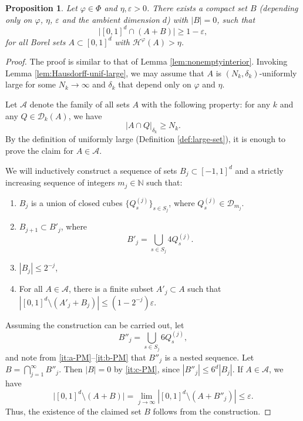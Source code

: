 \documentclass[12pt]{amsart}
\newcommand{\e}{\varepsilon}
\renewcommand{\phi}{\varphi}
\newtheorem{proposition}[theorem]{Proposition}
\def\N{{\mathbb{N}}}
\newcommand{\cD}{\mathcal{D}}
\numberwithin{theorem}{section}
\numberwithin{equation}{section}
\begin{document}
\begin{proposition}
    Let $\phi\in\Phi$ and $\eta,\e>0$. There exists a compact set $B$ (depending only on $\phi$, $\eta$, $\e$ and the ambient dimension $d$) with $|B|=0$, such that
    \[
        \bigl|[0,1]^d\cap (A+B)\bigr| \ge 1-\e,
    \]
    for all Borel sets $A\subset [0,1]^d$ with $\mathcal{H}^{\phi}(A)>\eta$.
\end{proposition}
\begin{proof}
    The proof is similar to that of Lemma \ref{lem:nonemptyinterior}. Invoking Lemma \ref{lem:Hausdorff-unif-large}, we may assume that $A$ is $(N_k,\delta_k)$-uniformly large for some $N_k\to\infty$ and $\delta_k$ that depend only on $\phi$ and $\eta$.

    Let $\mathcal{A}$ denote the family of all sets $A$ with the following property: for any $k$ and any $Q\in\mathcal{D}_k(A)$, we have
    \begin{equation} \label{eq:good-assumption}
        |A\cap Q|_{\delta_k} \ge N_k.
    \end{equation}
    By the definition of uniformly large (Definition \ref{def:large-set}), it is enough to prove the claim for $A\in\mathcal{A}$.

    We will inductively construct a sequence of sets $B_j\subset [-1,1]^d$ and a strictly increasing sequence of integers $m_j\in\N$ such that:
    \begin{enumerate}[label=(\alph*)]
        \item \label{it:a-PM} $B_j$ is a union of closed cubes $\{Q^{(j)}_s\}_{s\in S_j}$, where $Q^{(j)}_s\in\cD_{m_j}$.
        \item \label{it:b-PM} $B_{j+1}\subset B'_j$, where
        \[
            B'_j = \bigcup_{s\in S_j} 4 Q ^{(j)}_s.
        \]
        \item \label{it:c-PM} $|B_j|\le  2^{-j}$,
        \item \label{it:d-PM} For all $A\in\mathcal{A}$, there is a finite subset $A'_j\subset A$ such that $\left| [0,1]^d\setminus (A'_j+B_j)\right|\le (1-2^{-j})\e$.

    \end{enumerate}
    Assuming the construction can be carried out, let
    \[
        B''_j = \bigcup_{s\in S_j} 6 Q^{(j)}_s,
    \]
    and note from \ref{it:a-PM}--\ref{it:b-PM} that $B''_j$ is a nested sequence. Let $B=\bigcap_{j=1}^\infty B''_j$. Then $|B|=0$ by \ref{it:c-PM}, since $|B''_j|\le 6^d |B_j|$. If $A\in\mathcal{A}$, we have
    \[
        \bigl|[0,1]^d\setminus (A+B)\bigr| = \lim_{j\to\infty} \left|[0,1]^d\setminus (A+B''_j)\right| \le \e.
    \]
    Thus, the existence of the claimed set $B$ follows from the construction.


\end{proof}
\end{document}
